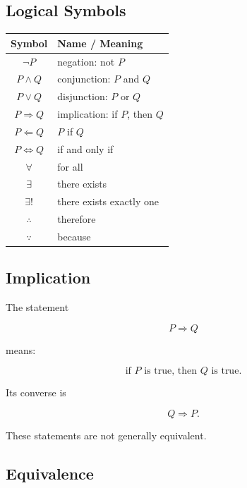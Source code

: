 \subsection{Logical Symbols}
\label{subsec:logical-symbols-reference}

\begin{center}
\begin{tabular}{c|l}
\textbf{Symbol} & \textbf{Name / Meaning} \\ \hline
\( \neg P \) & negation: not \(P\) \\
\( P\land Q \) & conjunction: \(P\) and \(Q\) \\
\( P\lor Q \) & disjunction: \(P\) or \(Q\) \\
\( P\Rightarrow Q \) & implication: if \(P\), then \(Q\) \\
\( P\Leftarrow Q \) & \(P\) if \(Q\) \\
\( P\Leftrightarrow Q \) & if and only if \\
\( \forall \) & for all \\
\( \exists \) & there exists \\
\( \exists! \) & there exists exactly one \\
\( \therefore \) & therefore \\
\( \because \) & because
\end{tabular}
\end{center}

\subsection{Implication}
\label{subsec:implication-symbol}

The statement

\[
\boxed{
P\Rightarrow Q
}
\]

means:

\[
\boxed{
\text{if }P\text{ is true, then }Q\text{ is true}.
}
\]

Its converse is

\[
\boxed{
Q\Rightarrow P.
}
\]

These statements are not generally equivalent.

\subsection{Equivalence}
\label{subsec:logical-equivalence-reference}

